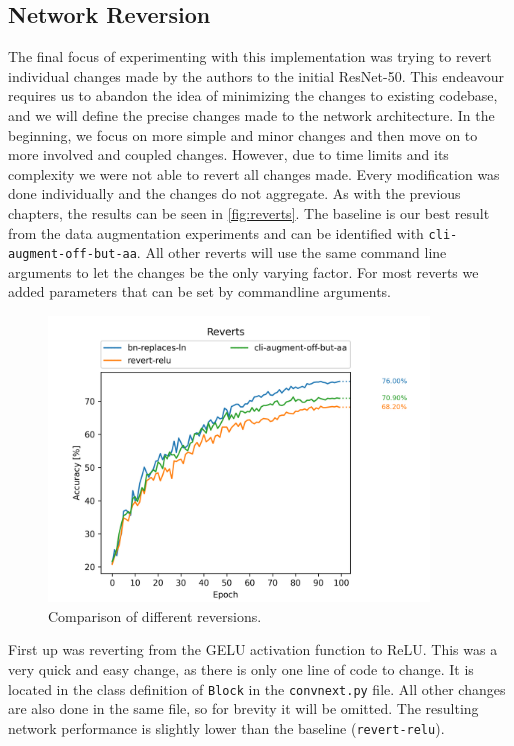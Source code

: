 \documentclass{article}
\begin{document}
\subsection{Network Reversion}\label{subsec:network-reversion}
The final focus of experimenting with this implementation was trying to revert individual changes made by the authors to the initial ResNet-50.
This endeavour requires us to abandon the idea of minimizing the changes to existing codebase, and we will define the precise changes made to the network architecture.
In the beginning, we focus on more simple and minor changes and then move on to more involved and coupled changes.
However, due to time limits and its complexity we were not able to revert all changes made.
Every modification was done individually and the changes do not aggregate.
As with the previous chapters, the results can be seen in \autoref{fig:reverts}.
The baseline is our best result from the data augmentation experiments and can be identified with \texttt{cli-augment-off-but-aa}.
All other reverts will use the same command line arguments to let the changes be the only varying factor. For most reverts we added parameters that can be set by commandline arguments.

\begin{figure}[h]
    \centering
    \includegraphics[width=0.9\textwidth]{images/reverts}
    \caption{Comparison of different reversions.}
    \label{fig:reverts}
\end{figure}

First up was reverting from the GELU activation function to ReLU\@.
This was a very quick and easy change, as there is only one line of code to change.
It is located in the class definition of \texttt{Block} in the \texttt{convnext.py} file.
All other changes are also done in the same file, so for brevity it will be omitted.
The resulting network performance is slightly lower than the baseline (\texttt{revert-relu}).
\end{document}
